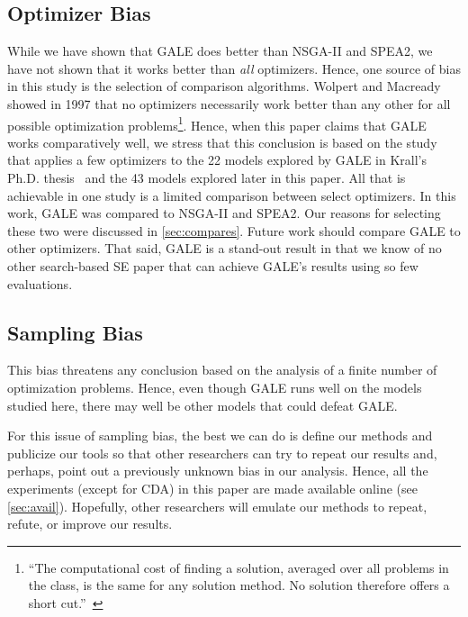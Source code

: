\documentclass[10pt,journal,compsoc]{IEEEtran}
\newcommand{\tion}[1]{\textsection\ref{sec:#1}}
\begin{document}
\subsection{Optimizer Bias}\label{sec:ob}
While we have shown that GALE does better than NSGA-II and SPEA2, we have not shown
that it works better than {\em all} optimizers. Hence, one source of bias in this
study is the selection of comparison algorithms.
Wolpert and Macready~\cite{wolpert97} showed in 1997
that no optimizers necessarily work better than any
other for all possible optimization
problems\footnote{``The computational
  cost of finding a solution, averaged over all
  problems in the class, is the same for any
  solution method.  No solution therefore offers a
  short cut.''~\cite{wolpert97}}. Hence, when this paper claims that
GALE works comparatively well, we  stress that this conclusion 
is based on the study that applies a few optimizers to the
22 models explored by GALE in Krall's Ph.D. thesis~\cite{krall14f}
and the 43 models explored later in this paper.
All that is achievable in one study is a limited comparison between select optimizers. 
In this work, GALE was compared to 
NSGA-II and SPEA2. Our reasons for
selecting these two were discussed in
\tion{compares}.  Future work should compare GALE to other optimizers.
That said, GALE is a stand-out result in that we know of no other search-based
SE paper that can achieve GALE's results using so few evaluations.




\subsection{ Sampling Bias}
This bias threatens any conclusion based on the
analysis of a finite number of optimization
problems.  Hence, even though GALE runs well on
the models studied here, there may well be other
models that could defeat GALE.  

For this issue of sampling bias, the best we can do
is define our methods and publicize our tools so
that other researchers can try to repeat our results
and, perhaps, point out a previously unknown bias in
our analysis. Hence, all the experiments (except for
CDA) in this paper are made available online (see \tion{avail}).  Hopefully, other
researchers will emulate our methods to repeat,
refute, or improve our results.
\end{document}
